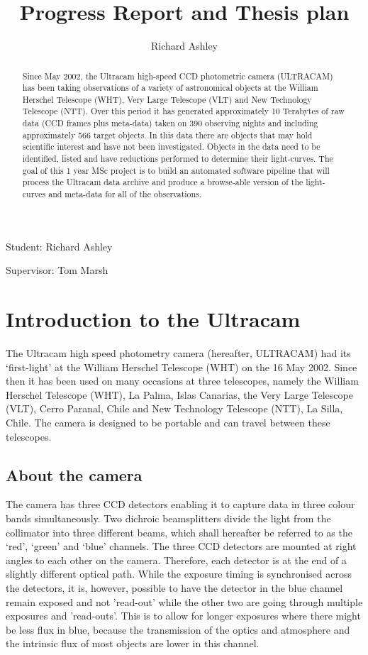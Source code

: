\documentclass[a4paper,10pt]{article}
\begin{document}
\title{Progress Report and Thesis plan}
\author{Richard Ashley}
\maketitle
\begin{flushright}
Student: Richard Ashley

Supervisor: Tom Marsh
\end{flushright}

\begin{abstract} 
Since May 2002, the  Ultracam high-speed CCD photometric camera (ULTRACAM) has been taking observations of a variety of astronomical objects at the William Herschel Telescope (WHT), Very Large Telescope (VLT) and New Technology Telescope (NTT). Over this period it has generated approximately 10 Terabytes of raw data (CCD frames plus meta-data) taken on 390 observing nights and including approximately 566 target objects. In this data there are objects that may hold scientific interest and have not been investigated. Objects in the data need to be identified, listed and have reductions performed to determine their light-curves. The goal of this 1 year MSc project is to build an automated software pipeline that will process the Ultracam data archive and produce a browse-able 
version of the light-curves and meta-data for all of the observations. 
\end{abstract}

\section{Introduction to the Ultracam} 

The Ultracam high speed photometry camera (hereafter, ULTRACAM) had its `first-light' at the William Herschel Telescope (WHT) on the 16 May 2002. Since then it has been used on many occasions at three telescopes, namely the William Herschel Telescope (WHT), La Palma, Islas Canarias, the Very Large Telescope (VLT), Cerro Paranal, Chile and New Technology Telescope (NTT), La Silla, Chile. The camera is designed to be portable and can travel between these telescopes. 

\subsection{About the camera}
The camera has three CCD detectors enabling it to capture data in three colour bands simultaneously. Two dichroic beamsplitters divide the light from the collimator into three different beams, which shall hereafter be referred to as the `red', `green' and `blue' channels. The three CCD detectors are mounted at right angles to each other on the camera. Therefore, each detector is at the end of a slightly different optical path. While the exposure timing is synchronised across the detectors, it is, however, possible to have the detector in the blue channel remain exposed and not 'read-out' while the other two are going through multiple exposures and 'read-outs'. This is to allow for longer exposures where there might be less flux in blue, because the transmission of the optics and atmosphere and the intrinsic flux of most objects are lower in this channel.
\end{document}
